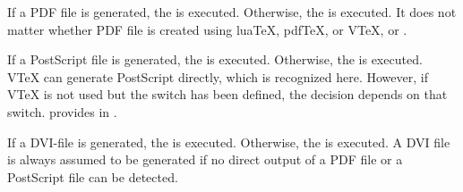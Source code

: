 \begin{Declaration}
\end{Declaration}
If a PDF file is generated, the
 is executed. Otherwise, the  is
executed. It does not matter whether PDF file is created using lua\TeX{},
pdf\TeX{}, or V\TeX{}, or \XeTeX{}.%
\EndIndexGroup


\begin{Declaration}
\end{Declaration}
If a PostScript file is generated, the
 is executed.  Otherwise, the  is
executed. V\TeX{} can generate PostScript directly, which is recognized
here. However, if V\TeX{} is not used but the switch  has been
defined, the decision depends on that switch. \KOMAScript{} provides
 in
\hyperref[cha:typearea]{}%
.
%
\EndIndexGroup


\begin{Declaration}
\end{Declaration}
If a DVI-file is generated, the
 is executed. Otherwise, the  is
executed. A DVI file is always assumed to be generated if no direct output of
a PDF file or a PostScript file can be detected.%
\EndIndexGroup


